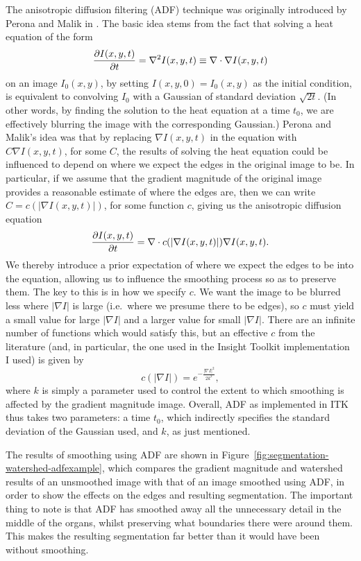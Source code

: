 The anisotropic diffusion filtering (ADF) technique was originally introduced by Perona and Malik in \cite{perona90}. The basic idea stems from the fact that solving a heat equation of the form
%
\[
\frac{\partial I(x,y,t)}{\partial t} = \nabla^2 I(x,y,t) \equiv \nabla \cdot \nabla I(x,y,t)
\]
%
on an image $I_0(x,y)$, by setting $I(x,y,0) = I_0(x,y)$ as the initial condition, is equivalent to convolving $I_0$ with a Gaussian of standard deviation $\sqrt{2t}$. (In other words, by finding the solution to the heat equation at a time $t_0$, we are effectively blurring the image with the corresponding Gaussian.) Perona and Malik's idea was that by replacing $\nabla I(x,y,t)$ in the equation with $C \nabla I(x,y,t)$, for some $C$, the results of solving the heat equation could be influenced to depend on where we expect the edges in the original image to be. In particular, if we assume that the gradient magnitude of the original image provides a reasonable estimate of where the edges are, then we can write $C = c(|\nabla I(x,y,t)|)$, for some function $c$, giving us the anisotropic diffusion equation
%
\[
\frac{\partial I(x,y,t)}{\partial t} = \nabla \cdot c(|\nabla I(x,y,t)|) \nabla I(x,y,t).
\]
%
We thereby introduce a prior expectation of where we expect the edges to be into the equation, allowing us to influence the smoothing process so as to preserve them. The key to this is in how we specify $c$. We want the image to be blurred less where $|\nabla I|$ is large (i.e.~where we presume there to be edges), so $c$ must yield a small value for large $|\nabla I|$ and a larger value for small $|\nabla I|$. There are an infinite number of functions which would satisfy this, but an effective $c$ from the literature (and, in particular, the one used in the Insight Toolkit \cite{itk} implementation I used) is given by
%
\[
c(|\nabla I|) = e^{-\frac{|\nabla I|^2}{2k^2}},
\]
%
where $k$ is simply a parameter used to control the extent to which smoothing is affected by the gradient magnitude image. Overall, ADF as implemented in ITK thus takes two parameters: a time $t_0$, which indirectly specifies the standard deviation of the Gaussian used, and $k$, as just mentioned.

The results of smoothing using ADF are shown in Figure~\ref{fig:segmentation-watershed-adfexample}, which compares the gradient magnitude and watershed results of an unsmoothed image with that of an image smoothed using ADF, in order to show the effects on the edges and resulting segmentation. The important thing to note is that ADF has smoothed away all the unnecessary detail in the middle of the organs, whilst preserving what boundaries there were around them. This makes the resulting segmentation far better than it would have been without smoothing.

